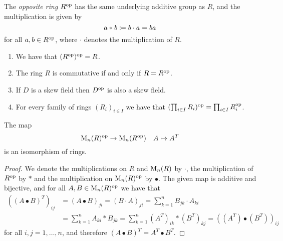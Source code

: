\begin{definition}
  The \emph{opposite ring} $R^{\mathrm{op}}$ has the same underlying additive group as $R$, and the multiplication is given by
  \[
              a * b
    \coloneqq  b \cdot a
    =         ba
  \]
  for all $a, b \in R^{\mathrm{op}}$, where $\cdot$ denotes the multiplication of $R$.
\end{definition}


\begin{remark}
  \label{remark: basic properties of op}
  \leavevmode
  \begin{enumerate}
    \item
      We have that $( R^{\mathrm{op}} )^{\mathrm{op}} = R$.
    \item
      The ring $R$ is commutative if and only if $R = R^{\mathrm{op}}$.
    \item
      If $D$ is a skew field then $D^{\mathrm{op}}$ is also a skew field.
    \item
      For every family of rings $(R_i)_{i \in I}$ we have that $( \prod_{i \in I} R_i )^{\mathrm{op}} = \prod_{i \in I} R_i^{\mathrm{op}}$.
  \end{enumerate}
\end{remark}


\begin{lemma}
  \label{lemma: op of matrix rings}
  The map
  \[
            \operatorname{M}_n(R)^{\mathrm{op}}
    \to     \operatorname{M}_n(R^{\mathrm{op}})
    \quad   A
    \mapsto A^T
  \]
  is an isomorphism of rings.
\end{lemma}


\begin{proof}
  We denote the multiplications on $R$ and $\operatorname{M}_n(R)$ by $\cdot$, the multiplication of $R^{\mathrm{op}}$ by $*$ and the multiplication on $\operatorname{M}_n(R)^{\mathrm{op}}$ by $\bullet$.
  The given map is additive and bijective, and for all $A, B \in \operatorname{M}_n(R)^{\mathrm{op}}$ we have that
  \begin{align*}
        \left( (A \bullet B)^T \right)_{ij}
    &=  (A \bullet B)_{ji}
     =  (B \cdot A)_{ji}
     =  \sum_{k=1}^n B_{jk} \cdot A_{ki}  \\
    &=  \sum_{k=1}^n A_{ki} * B_{jk}
     =  \sum_{k=1}^n (A^T)_{ik} * (B^T)_{kj}
     =  \left( (A^T) \bullet (B^T) \right)_{ij}
  \end{align*}
  for all $i, j = 1, \dotsc, n$, and therefore $(A \bullet B)^T = A^T \bullet B^T$.
\end{proof}




